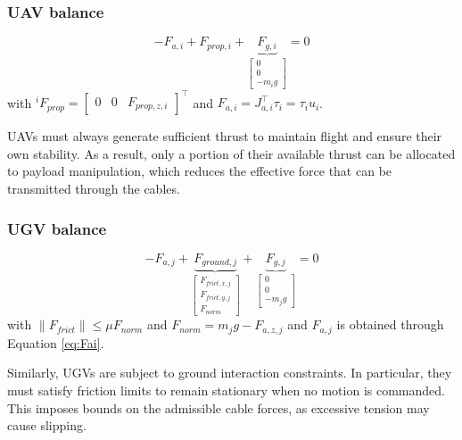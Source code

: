 \subsubsection{UAV balance} %
\begin{equation}
    -F_{a,i} + F_{prop, i} + \underbrace{F_{g,i}}_{\begin{bmatrix}
        0 \\ 0 \\ - m_{i} g
    \end{bmatrix}} = 0
    \label{eq:uavbalance}
\end{equation}
with $^iF_{prop} = \begin{bmatrix}
        0 & 0 & F_{prop,z,i}
    \end{bmatrix}^\top$ and $F_{a, i} = J_{a, i}^\top \tau_i = \tau_i u_i$.

UAVs must always generate sufficient thrust to maintain flight and ensure their own stability. As a result, only a portion of their available thrust can be allocated to payload manipulation, which reduces the effective force that can be transmitted through the cables.

\subsubsection{UGV balance}
\begin{equation}
    -F_{a,j} + \underbrace{F_{ground, j}}_{\begin{bmatrix}
        F_{frict,x,j} \\ F_{frict,y,j} \\ F_{norm}
    \end{bmatrix}} + \underbrace{F_{g,j}}_{\begin{bmatrix}
        0 \\ 0 \\ - m_{j} g
    \end{bmatrix}} = 0
    \label{eq:ugvbalance}
\end{equation}
with $\|F_{frict}\| \le \mu F_{norm}$ and $F_{norm} = m_j g - F_{a, z, j}$ and $F_{a,j}$ is obtained through Equation \ref{eq:Fai}.

Similarly, UGVs are subject to ground interaction constraints. In particular, they must satisfy friction limits to remain stationary when no motion is commanded. This imposes bounds on the admissible cable forces, as excessive tension may cause slipping.


